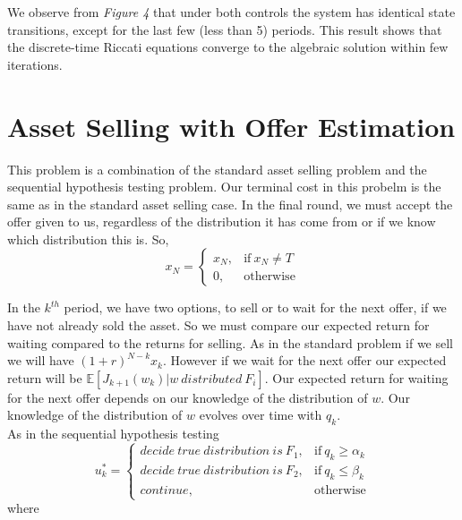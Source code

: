 \documentclass[11pt, oneside]{article}   	%
\begin{document}
We observe from \textit{Figure 4} that under both controls the system has identical state transitions, except for the last few (less than 5) periods. This result shows that the discrete-time Riccati equations converge to the algebraic solution within few iterations.

\section{Asset Selling with Offer Estimation}
This problem is a combination of the standard asset selling problem and the sequential hypothesis testing problem. Our terminal cost in this probelm is the same as in the standard asset selling case. In the final round, we must accept the offer given to us, regardless of the distribution it has come from or if we know which distribution this is. So,  
 \begin{equation}
    x_{N}=
    \begin{cases}
      x_{N}, & \text{if}\ x_{N}\neq T \\
      0, & \text{otherwise}
    \end{cases}
  \end{equation}
 
In the $k^{th}$ period, we have two options, to sell or to wait for the next offer, if we have not already sold the asset. So we must compare our expected return for waiting compared to the returns for selling. As in the standard problem if we sell we will have $(1+r)^{N-k}x_{k}$. However if we wait for the next offer our expected return will be $\mathbb{E}[J_{k+1}(w_{k})| w~distributed~ F_{i}]$. Our expected return for waiting for the next offer depends on our knowledge of the distribution of $w$. Our knowledge of the distribution of $w$ evolves over time with $q_{k}$. \\
As in the sequential hypothesis testing 
 \begin{equation}
    u^{*}_{k}=
    \begin{cases}
      decide~true~ distribution ~is~ F_{1}, & \text{if}\ q_{k} \geq \alpha_{k} \\
      decide ~true~ distribution~ is~ F_{2}, & \text{if}\ q_{k} \leq \beta_{k} \\
      continue, & \text{otherwise}
    \end{cases}
  \end{equation}
where
\end{document}
